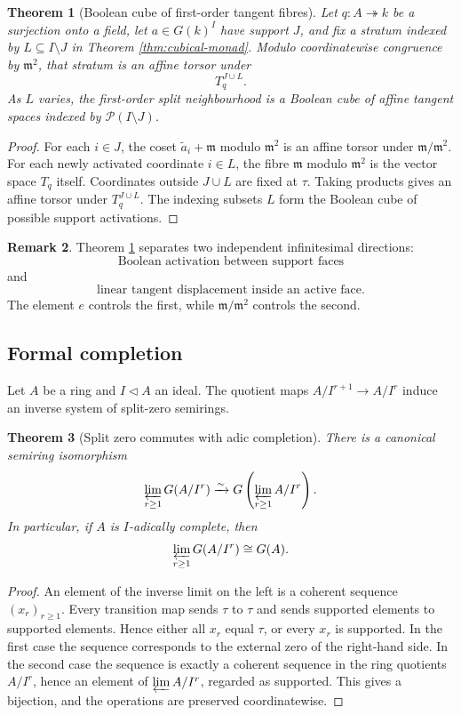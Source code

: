 \documentclass[11pt]{amsart}
\numberwithin{equation}{section}
\newtheorem{theorem}{Theorem}[section]
\theoremstyle{definition}
\newtheorem{remark}[theorem]{Remark}
\begin{document}
\begin{theorem}[Boolean cube of first-order tangent fibres]\label{thm:first-order-cubical}
Let $q:A\twoheadrightarrow k$ be a surjection onto a field, let $a\in G(k)^I$ have support $J$, and fix a stratum indexed by $L\subseteq I\setminus J$ in Theorem \ref{thm:cubical-monad}.  Modulo coordinatewise congruence by $\mathfrak m^2$, that stratum is an affine torsor under
\[
T_q^{J\cup L}.
\]
As $L$ varies, the first-order split neighbourhood is a Boolean cube of affine tangent spaces indexed by $\mathcal P(I\setminus J)$.
\end{theorem}

\begin{proof}
For each $i\in J$, the coset $\widetilde a_i+\mathfrak m$ modulo $\mathfrak m^2$ is an affine torsor under $\mathfrak m/\mathfrak m^2$.  For each newly activated coordinate $i\in L$, the fibre $\mathfrak m$ modulo $\mathfrak m^2$ is the vector space $T_q$ itself.  Coordinates outside $J\cup L$ are fixed at $\tau$.  Taking products gives an affine torsor under $T_q^{J\cup L}$.  The indexing subsets $L$ form the Boolean cube of possible support activations.
\end{proof}

\begin{remark}
Theorem \ref{thm:first-order-cubical} separates two independent infinitesimal directions:
\[
\text{Boolean activation between support faces}
\]
and
\[
\text{linear tangent displacement inside an active face}.
\]
The element $e$ controls the first, while $\mathfrak m/\mathfrak m^2$ controls the second.
\end{remark}

\subsection{Formal completion}

Let $A$ be a ring and $I\triangleleft A$ an ideal.  The quotient maps $A/I^{r+1}\to A/I^r$ induce an inverse system of split-zero semirings.

\begin{theorem}[Split zero commutes with adic completion]\label{thm:completion-commutes}
There is a canonical semiring isomorphism
\[
\varprojlim_{r\ge1}G(A/I^r)
\xrightarrow{\sim}
G\left(\varprojlim_{r\ge1}A/I^r\right).
\]
In particular, if $A$ is $I$-adically complete, then
\[
\varprojlim_{r\ge1}G(A/I^r)
\cong
G(A).
\]
\end{theorem}

\begin{proof}
An element of the inverse limit on the left is a coherent sequence $(x_r)_{r\ge1}$.  Every transition map sends $\tau$ to $\tau$ and sends supported elements to supported elements.  Hence either all $x_r$ equal $\tau$, or every $x_r$ is supported.  In the first case the sequence corresponds to the external zero of the right-hand side.  In the second case the sequence is exactly a coherent sequence in the ring quotients $A/I^r$, hence an element of $\varprojlim A/I^r$, regarded as supported.  This gives a bijection, and the operations are preserved coordinatewise.
\end{proof}
\end{document}
